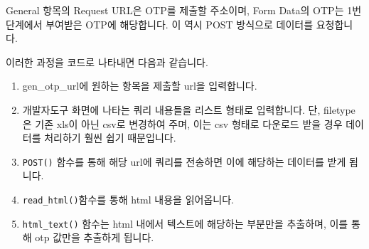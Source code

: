 \documentclass[]{book}
\newenvironment{Shaded}{\begin{snugshade}}{\end{snugshade}}
\newcommand{\DataTypeTok}[1]{\textcolor[rgb]{0.13,0.29,0.53}{#1}}
\newcommand{\KeywordTok}[1]{\textcolor[rgb]{0.13,0.29,0.53}{\textbf{#1}}}
\newcommand{\NormalTok}[1]{#1}
\newcommand{\OperatorTok}[1]{\textcolor[rgb]{0.81,0.36,0.00}{\textbf{#1}}}
\newcommand{\StringTok}[1]{\textcolor[rgb]{0.31,0.60,0.02}{#1}}
\providecommand{\tightlist}{%
  \setlength{\itemsep}{0pt}\setlength{\parskip}{0pt}}
\begin{document}
General 항목의 Request URL은 OTP를 제출할 주소이며, Form Data의 OTP는 1번 단계에서 부여받은 OTP에 해당합니다. 이 역시 POST 방식으로 데이터를 요청합니다.

이러한 과정을 코드로 나타내면 다음과 같습니다.

\begin{Shaded}
\end{Shaded}

\begin{enumerate}
\def\labelenumi{\arabic{enumi}.}
\tightlist
\item
  gen\_otp\_url에 원하는 항목을 제출할 url을 입력합니다.
\item
  개발자도구 화면에 나타는 쿼리 내용들을 리스트 형태로 입력합니다. 단, filetype은 기존 xls이 아닌 csv로 변경하여 주며, 이는 csv 형태로 다운로드 받을 경우 데이터를 처리하기 훨씬 쉽기 때문입니다.
\item
  \texttt{POST()} 함수를 통해 해당 url에 쿼리를 전송하면 이에 해당하는 데이터를 받게 됩니다.
\item
  \texttt{read\_html()}함수를 통해 html 내용을 읽어옵니다.
\item
  \texttt{html\_text()} 함수는 html 내에서 텍스트에 해당하는 부분만을 추출하며, 이를 통해 otp 값만을 추출하게 됩니다.
\end{enumerate}
\end{document}
